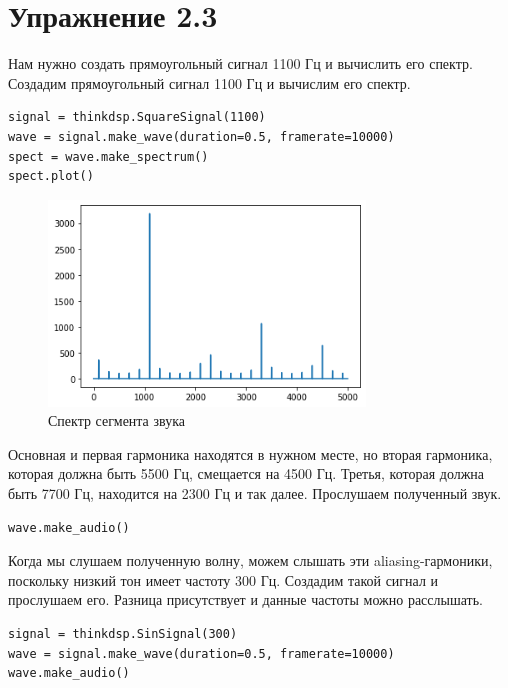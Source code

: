 \documentclass[a4paper,12pt]{report}
\begin{document}
\chapter{Упражнение 2.3}

Нам нужно создать прямоугольный сигнал 1100 Гц и вычислить его спектр.
Создадим прямоугольный сигнал 1100 Гц и вычислим его спектр.

\begin{lstlisting}[caption=Создание прямоугольного сигнала]
signal = thinkdsp.SquareSignal(1100)
wave = signal.make_wave(duration=0.5, framerate=10000)
spect = wave.make_spectrum()
spect.plot()
\end{lstlisting}

\begin{figure}[H]
        \centering
        \includegraphics[width=0.75\textwidth]{3.png}
        \caption{Спектр сегмента звука}
        \label{fig:fig3_1}
\end{figure}

Основная и первая гармоника находятся в нужном месте, но вторая гармоника, которая должна быть 5500 Гц, смещается на 4500 Гц. Третья, которая должна быть 7700 Гц, находится на 2300 Гц и так далее. Прослушаем полученный звук.

\begin{lstlisting}[caption=Воспроизведение прямоугольного сигнала]
wave.make_audio()
\end{lstlisting}

Когда мы слушаем полученную волну, можем слышать эти aliasing-гармоники, поскольку низкий тон имеет частоту 300 Гц. Создадим такой сигнал и прослушаем его. Разница присутствует и данные частоты можно расслышать.

\begin{lstlisting}[caption=Создание и воспроизведение сигнала с пониженной частотой]
signal = thinkdsp.SinSignal(300)
wave = signal.make_wave(duration=0.5, framerate=10000)
wave.make_audio()
\end{lstlisting}
\end{document}
